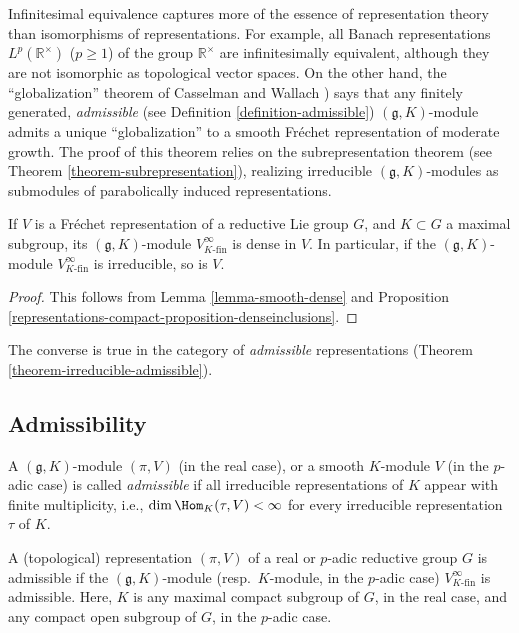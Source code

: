 \begin{remark}
 \label{remark-infinitesimal-equivalence}
Infinitesimal equivalence captures more of the essence of representation theory than isomorphisms of representations. For example, all Banach representations $L^p(\mathbb R^\times)$ ($p\ge 1$) of the group $\mathbb R^\times$ are infinitesimally equivalent, although they are not isomorphic as topological vector spaces. On the other hand, the ``globalization'' theorem of Casselman and Wallach \cite{Casselman-canonicalextensions, Wallach-RR2, Bernstein-Kroetz}) says that any finitely generated, \emph{admissible} (see Definition \ref{definition-admissible}) $(\mathfrak g, K)$-module admits a unique ``globalization'' to a smooth Fr\'echet representation of moderate growth. The proof of this theorem relies on the subrepresentation theorem (see Theorem \ref{theorem-subrepresentation}), realizing irreducible $(\mathfrak g,K)$-modules as submodules of parabolically induced representations.
\end{remark}



\begin{lemma}
 \label{lemma-gK-dense}
If $V$ is a Fr\'echet representation of a reductive Lie group $G$, and $K\subset G$ a maximal subgroup, its $(\mathfrak g,K)$-module $V^\infty_{K\text{-fin}}$ is dense in $V$. In particular, if the $(\mathfrak g, K)$-module $V^\infty_{K\text{-fin}}$ is irreducible, so is $V$. 
\end{lemma}

\begin{proof}
 This follows from Lemma \ref{lemma-smooth-dense} and Proposition \ref{representations-compact-proposition-denseinclusions}. 
\end{proof}

The converse is true in the category of \emph{admissible} representations (Theorem \ref{theorem-irreducible-admissible}). 


\subsection{Admissibility}
\label{subsection-admissibility}


\begin{definition}
 \label{definition-admissible}
A $(\mathfrak g, K)$-module $(\pi, V)$ (in the real case), or a smooth $K$-module $V$ (in the $p$-adic case) is called {\it admissible} if  all irreducible representations of $K$ appear with finite multiplicity, i.e., $\dim\Hom_K(\tau, V)<\infty$ for every irreducible representation $\tau$ of $K$. 

A (topological) representation $(\pi, V)$ of a real or $p$-adic reductive group $G$ is admissible if the $(\mathfrak g, K)$-module (resp.\ $K$-module, in the $p$-adic case) $V^\infty_{K\text{-fin}}$ is admissible. Here, $K$ is any maximal compact subgroup of $G$, in the real case, and any compact open subgroup of $G$, in the $p$-adic case.
\end{definition}


